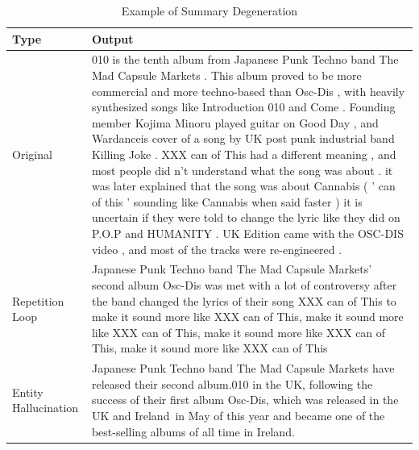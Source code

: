 \documentclass[12pt]{report}
\begin{document}
         \begin{table}[H]
            \begin{center}
            \begin{tabular}{|l|p{9cm}|}\hline
                
                \textbf{Type} & \textbf{Output}\\\hline
                
                Original & 010 is the tenth album from Japanese Punk Techno band The Mad Capsule Markets . This album proved to be more commercial and more techno-based than Osc-Dis , with heavily synthesized songs like Introduction 010 and Come . Founding member Kojima Minoru played guitar on Good Day , and Wardanceis cover of a song by UK post punk industrial band Killing Joke . XXX can of This had a different meaning , and most people did n't understand what the song was about . it was later explained that the song was about Cannabis ( ' can of this ' sounding like Cannabis when said faster ) it is uncertain if they were told to change the lyric like they did on P.O.P and HUMANITY . UK Edition came with the OSC-DIS video , and most of the tracks were re-engineered .
\\\hline
                Repetition Loop & Japanese Punk Techno band The Mad Capsule Markets' second album Osc-Dis was met with a lot of controversy after the band changed the lyrics of their song XXX can of This to make it sound more like \color{blue} XXX can of This, make it sound more like XXX can of This, make it sound more like XXX can of This, make it sound more like XXX can of This\\\hline
                
                Entity Hallucination & Japanese Punk Techno band The Mad Capsule Markets have released their second album.010 in the UK, following the success of their first album Osc-Dis, which was released in the UK and \color{red}Ireland\color{black}\ in May of this year and became one of the best-selling albums of all time in \color{red}Ireland\color{black}.\\\hline
                
            
            \end{tabular}
            \end{center}
            \caption{Example of Summary Degeneration}
            \label{tab:degeneration}
            \end{table}
         
         \newpage
        
\end{document}
